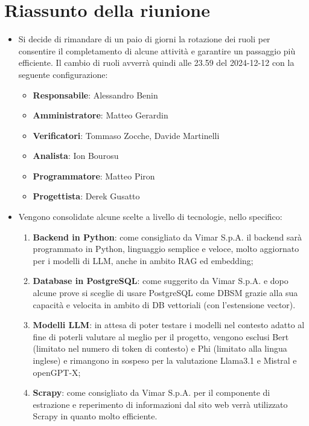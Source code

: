 \section{Riassunto della riunione}
\begin{itemize}
    \item Si decide di rimandare di un paio di giorni la rotazione dei ruoli per consentire il completamento di alcune attività e garantire un passaggio più efficiente. Il cambio di ruoli avverrà quindi alle 23.59 del 2024-12-12 con la seguente configurazione:
    \begin{itemize}
    \item \textbf{Responsabile}: Alessandro Benin 
    \item \textbf{Amministratore}: Matteo Gerardin 
    \item \textbf{Verificatori}: Tommaso Zocche, Davide Martinelli
    \item \textbf{Analista}: Ion Bourosu
    \item \textbf{Programmatore}: Matteo Piron
    \item \textbf{Progettista}: Derek Gusatto
    \end{itemize}
    \item Vengono consolidate alcune scelte a livello di tecnologie, nello specifico:
    \begin{enumerate}
        \item \textbf{Backend in Python}: come consigliato da Vimar S.p.A. il backend sarà programmato in Python, linguaggio semplice e veloce, molto aggiornato per i modelli di LLM, anche in ambito RAG ed embedding;
        \item \textbf{Database in PostgreSQL}: come suggerito da Vimar S.p.A. e dopo alcune prove si sceglie di usare PostgreSQL come DBSM grazie alla sua capacità e velocita in ambito di DB vettoriali (con l'estensione vector).
        \item \textbf{Modelli LLM}: in attesa di poter testare i modelli nel contesto adatto al fine di poterli valutare al meglio per il progetto, vengono esclusi Bert (limitato nel numero di token di contesto) e Phi (limitato alla lingua inglese) e rimangono in sospeso per la valutazione Llama3.1 e Mistral e openGPT-X;
        \item \textbf{Scrapy}: come consigliato da Vimar S.p.A. per il componente di estrazione e reperimento di informazioni dal sito web verrà utilizzato Scrapy in quanto molto efficiente.
    \end{enumerate}   
\end{itemize}